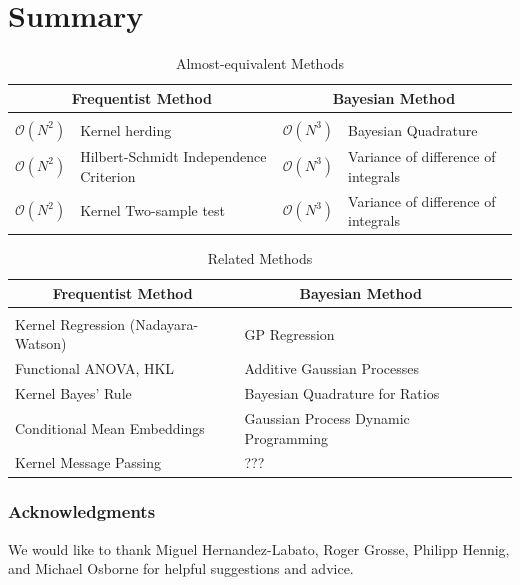 \documentclass{article} %
\begin{document}
\section{Summary}
\begin{table}[h]
\caption{Almost-equivalent Methods}
\label{sample-table}
\begin{center}
\begin{tabular}{llll}
\multicolumn{2}{c}{ \bf Frequentist Method}  &\multicolumn{2}{c}{\bf Bayesian Method}
\\ \hline \\
$\mathcal{O}(N^2)$ & Kernel herding        					& $\mathcal{O}(N^3)$ & Bayesian Quadrature \\
$\mathcal{O}(N^2)$ & Hilbert-Schmidt Independence Criterion & $\mathcal{O}(N^3)$ & Variance of difference of integrals \\
$\mathcal{O}(N^2)$ & Kernel Two-sample test				    & $\mathcal{O}(N^3)$ & Variance of difference of integrals
\end{tabular}
\end{center}
\end{table}


\begin{table}[h]
\caption{Related Methods}
\label{sample-table}
\begin{center}
\begin{tabular}{llll}
\multicolumn{1}{c}{ \bf Frequentist Method}  &\multicolumn{1}{c}{\bf Bayesian Method}
\\ \hline \\
Kernel Regression (Nadayara-Watson)			& GP Regression \\
Functional ANOVA, HKL						& Additive Gaussian Processes \\
Kernel Bayes' Rule							& Bayesian Quadrature for Ratios \\
Conditional Mean Embeddings 				& Gaussian Process Dynamic Programming \\
Kernel Message Passing 						& ???
\end{tabular}
\end{center}
\end{table}




\subsubsection*{Acknowledgments}

We would like to thank Miguel Hernandez-Labato, Roger Grosse, Philipp Hennig, and Michael Osborne for helpful suggestions and advice.



\end{document}
